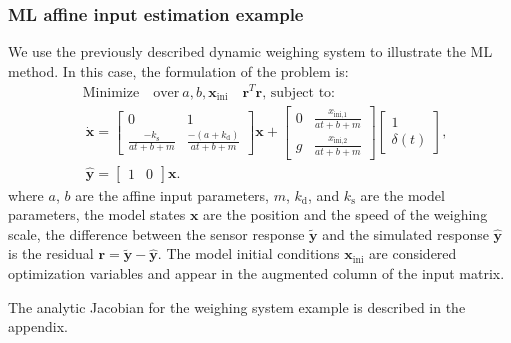 \subsubsection{ML affine input estimation example}
We use the previously described dynamic weighing system to illustrate the ML method.
In this case, the formulation of the problem is: 
 \begin{equation} \begin{aligned}
     & \text{Minimize} \quad \text{over} \ a, b, \mathbf{x}_{\text{ini}} \quad \mathbf{r}^T \mathbf{r} \text{, subject to:} \\ & \ \dot{\mathbf{x}} = \begin{bmatrix} 0 & 1 \\ \frac{-k_{\mathrm{s}}}{a t + b + m} & \frac{-(a + k_{\mathrm{d}})}{a t + b + m} \end{bmatrix} \mathbf{x} + \begin{bmatrix} 0 & \frac{x_{\text{ini,1}}}{a t + b + m} \\ g & \frac{x_{\text{ini,2}}}{a t + b + m}  \end{bmatrix} \begin{bmatrix} 1 \\ \delta(t)  \end{bmatrix}, \\ & \ \widehat{\mathbf{y}} = \begin{bmatrix} 1 & 0  \end{bmatrix} \mathbf{x} .  
 \end{aligned} \end{equation}
where $a$, $b$ are the affine input parameters, $m$, $k_{\mathrm{d}}$, and $k_{\mathrm{s}}$ are the model parameters, the model states $\mathbf{x}$ are the position and the speed of the weighing scale, the difference between the sensor response $\widetilde{\mathbf{y}}$ and the simulated response $\widehat{\mathbf{y}}$ is the residual $\mathbf{r} = \widetilde{\mathbf{y}} - \widehat{\mathbf{y}}$.  
The model initial conditions $\mathbf{x}_{\text{ini}}$ are considered optimization variables
and appear in the augmented column of the input matrix. 

The analytic Jacobian for the weighing system example is described in the appendix.


